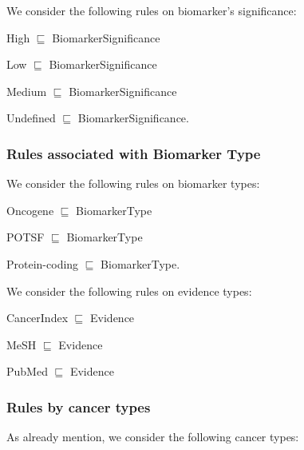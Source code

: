 We consider the following rules on biomarker's significance:

\vspace{-2mm}
\begin{itemize}[noitemsep]
\scriptsize{
    \item High $ \sqsubseteq $  BiomarkerSignificance
    \item Low $ \sqsubseteq $  BiomarkerSignificance
    \item Medium $ \sqsubseteq $  BiomarkerSignificance
    \item Undefined $ \sqsubseteq $  BiomarkerSignificance.}
\end{itemize}
\vspace{-2mm}

\subsubsection{Rules associated with Biomarker Type}
We consider the following rules on biomarker types:

\vspace{-2mm}
\begin{itemize}[noitemsep]
\scriptsize{
    \item Oncogene $ \sqsubseteq $  BiomarkerType
    \item POTSF $ \sqsubseteq $  BiomarkerType
    \item Protein-coding $ \sqsubseteq $  BiomarkerType.}
\end{itemize}
\vspace{-2mm}

We consider the following rules on evidence types:

\vspace{-2mm}
\begin{itemize}[noitemsep]
\scriptsize{
    \item CancerIndex $ \sqsubseteq $  Evidence
    \item MeSH $ \sqsubseteq $  Evidence
    \item PubMed $ \sqsubseteq $  Evidence}
\end{itemize}
\vspace{-2mm}

\subsubsection{Rules by cancer types}
As already mention, we consider the following cancer types:

